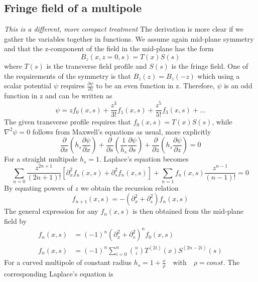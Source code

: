 \subsection{Fringe field of a multipole}
	\textit{This is a different, more compact treatment}
The derivation is more clear if we gather the variables together in functions. We assume again mid-plane symmetry and that the z-component of the field in the mid-plane has the form
	\begin{equation}
		B_z (x, z=0, s) = T(x) S(s)
	\end{equation}
where $T(s)$ is the transverse field profile and $S(s)$ is the fringe field. One of the requirements of the symmetry is that $B_z(z) = B_z(-z)$ which using a scalar potential $\psi$ requires $\frac{\partial \psi}{\partial z}$ to be an even function in z. Therefore, $\psi$ is an odd function in z and can be written as
	\begin{equation}
		\psi = z f_0(x,s) + \frac{z^3}{3!} f_1(x,s) + \frac{z^5}{5!} f_3(x,s) + \dots 
	\end{equation}
The given transverse profile requires that $f_0(x,s) = T(x)S(s)$, while $\nabla^2 \psi = 0$ follows from Maxwell's equations as usual, more explicitly 
	\begin{equation}
		\frac{\partial}{\partial x} \left( h_s \frac{\partial \psi}{\partial x} \right) + \frac{\partial}{\partial s} \left( \frac{1}{h_s} \frac{\partial \psi}{\partial s} \right) + \frac{\partial}{\partial z} \left( h_s \frac{\partial \psi}{\partial z} \right) = 0
	\end{equation}
For a straight multipole $h_s = 1$. Laplace's equation becomes
	\begin{equation}
		\sum_{n=0} \frac{z^{2n+1}}{(2n+1)!} \left[ \partial_x^2 f_n(x,s) + \partial_s^2 f_n(x,s) \right] + \sum_{n=1} f_n(x,s) \frac{z^{n-1}}{(n-1)!} = 0
	\end{equation}
By equating powers of $z$ we obtain the recursion relation
	\begin{equation}
		f_{n+1}(x,s) = - \left( \partial_x^2 + \partial_s^2 \right) f_n(x,s)
	\end{equation}
The general expression for any $f_n(x,s)$ is then obtained from the mid-plane field by
	\begin{align}
		f_n(x,s) & = (-1)^n \left( \partial_x^2 + \partial_s^2 \right)^n f_0(x,s) \\
		f_n(x,s) & = (-1)^n \sum_{i=0}^n \binom{n}{i}T^{(2i)}(x) S^{(2n-2i)}(s)
	\end{align}
For a curved multipole of constant radius $h_s = 1 + \frac{x}{\rho} \quad \text{with} \quad \rho = const.$ The corresponding Laplace's equation is 
